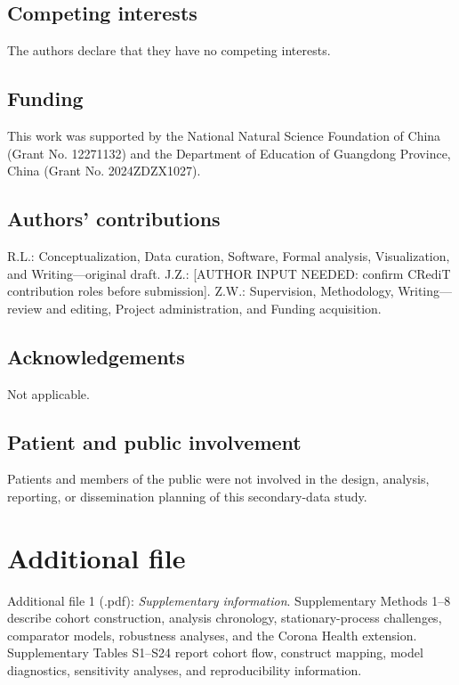 \documentclass[pdflatex,sn-vancouver-num]{sn-jnl}
\begin{document}
\subsection{Competing interests}

The authors declare that they have no competing interests.

\subsection{Funding}

This work was supported by the National Natural Science Foundation of China (Grant No. 12271132) and the Department of Education of Guangdong Province, China (Grant No. 2024ZDZX1027).

\subsection{Authors' contributions}

R.L.: Conceptualization, Data curation, Software, Formal analysis, Visualization, and Writing---original draft. J.Z.: [AUTHOR INPUT NEEDED: confirm CRediT contribution roles before submission]. Z.W.: Supervision, Methodology, Writing---review and editing, Project administration, and Funding acquisition.

\subsection{Acknowledgements}

Not applicable.

\subsection{Patient and public involvement}

Patients and members of the public were not involved in the design, analysis, reporting, or dissemination planning of this secondary-data study.

\section{Additional file}

Additional file 1 (.pdf): \textit{Supplementary information}. Supplementary Methods 1--8 describe cohort construction, analysis chronology, stationary-process challenges, comparator models, robustness analyses, and the Corona Health extension. Supplementary Tables S1--S24 report cohort flow, construct mapping, model diagnostics, sensitivity analyses, and reproducibility information.
\end{document}
